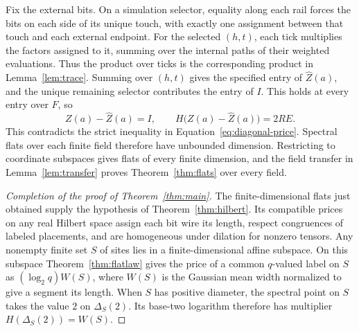 Fix the external bits. On a simulation selector, equality along each
rail forces the bits on each side of its unique touch, with exactly
one assignment between that touch and each external endpoint. For the selected $(h,t)$, each tick multiplies the factors assigned to
it, summing over the internal paths of their weighted evaluations. Thus
the product over ticks is the corresponding product in
Lemma~\ref{lem:trace}. Summing over $(h,t)$ gives the specified entry
of $\widehat Z(a)$, and the unique remaining selector contributes the
entry of $I$. This holds at every entry over $F$, so
\[
           Z(a)-\widehat Z(a)=I,\qquad
           H\bigl(Z(a)-\widehat Z(a)\bigr)=2RE .
\]
This contradicts the strict inequality in
Equation~\eqref{eq:diagonal-price}. Spectral flats over each finite
field therefore have unbounded dimension. Restricting to coordinate
subspaces gives flats of every finite dimension, and the field transfer
in Lemma~\ref{lem:transfer} proves Theorem~\ref{thm:flats} over every
field.

\begin{proof}[Completion of the proof of Theorem~\ref{thm:main}]
The finite-dimensional flats just obtained supply the hypothesis of
Theorem~\ref{thm:hilbert}. Its compatible prices on any real Hilbert
space assign each bit wire its length, respect congruences of labeled
placements, and are homogeneous under dilation for nonzero tensors.
Any nonempty finite set $S$ of sites lies in a finite-dimensional affine
subspace. On this subspace Theorem~\ref{thm:flatlaw} gives the price of a
common $q$-valued label on $S$ as $(\log_2 q)W(S)$, where $W(S)$ is the
Gaussian mean width normalized to give a segment its length. When
$S$ has positive diameter, the spectral point on $S$ takes the value
$2$ on $\Delta_S(2)$. Its base-two logarithm therefore has multiplier
$H(\Delta_S(2))=W(S)$.
\end{proof}
